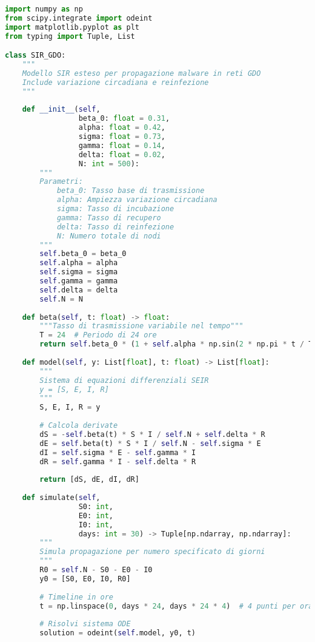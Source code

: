 \begin{lstlisting}[language=Python, caption=Simulazione modello SIR adattato per GDO]
import numpy as np
from scipy.integrate import odeint
import matplotlib.pyplot as plt
from typing import Tuple, List

class SIR_GDO:
    """
    Modello SIR esteso per propagazione malware in reti GDO
    Include variazione circadiana e reinfezione
    """
    
    def __init__(self, 
                 beta_0: float = 0.31,
                 alpha: float = 0.42,
                 sigma: float = 0.73,
                 gamma: float = 0.14,
                 delta: float = 0.02,
                 N: int = 500):
        """
        Parametri:
            beta_0: Tasso base di trasmissione
            alpha: Ampiezza variazione circadiana
            sigma: Tasso di incubazione
            gamma: Tasso di recupero
            delta: Tasso di reinfezione
            N: Numero totale di nodi
        """
        self.beta_0 = beta_0
        self.alpha = alpha
        self.sigma = sigma
        self.gamma = gamma
        self.delta = delta
        self.N = N
        
    def beta(self, t: float) -> float:
        """Tasso di trasmissione variabile nel tempo"""
        T = 24  # Periodo di 24 ore
        return self.beta_0 * (1 + self.alpha * np.sin(2 * np.pi * t / T))
    
    def model(self, y: List[float], t: float) -> List[float]:
        """
        Sistema di equazioni differenziali SEIR
        y = [S, E, I, R]
        """
        S, E, I, R = y
        
        # Calcola derivate
        dS = -self.beta(t) * S * I / self.N + self.delta * R
        dE = self.beta(t) * S * I / self.N - self.sigma * E
        dI = self.sigma * E - self.gamma * I
        dR = self.gamma * I - self.delta * R
        
        return [dS, dE, dI, dR]
    
    def simulate(self, 
                 S0: int, 
                 E0: int, 
                 I0: int,
                 days: int = 30) -> Tuple[np.ndarray, np.ndarray]:
        """
        Simula propagazione per numero specificato di giorni
        """
        R0 = self.N - S0 - E0 - I0
        y0 = [S0, E0, I0, R0]
        
        # Timeline in ore
        t = np.linspace(0, days * 24, days * 24 * 4)  # 4 punti per ora
        
        # Risolvi sistema ODE
        solution = odeint(self.model, y0, t)
        

\end{lstlisting}
